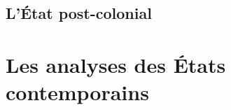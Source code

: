 \documentclass[10pt, a4paper, openany]{book}
\begin{document}
\section{}


\section{L'État post-colonial}



































\chapter{Les analyses des États contemporains}
\end{document}
